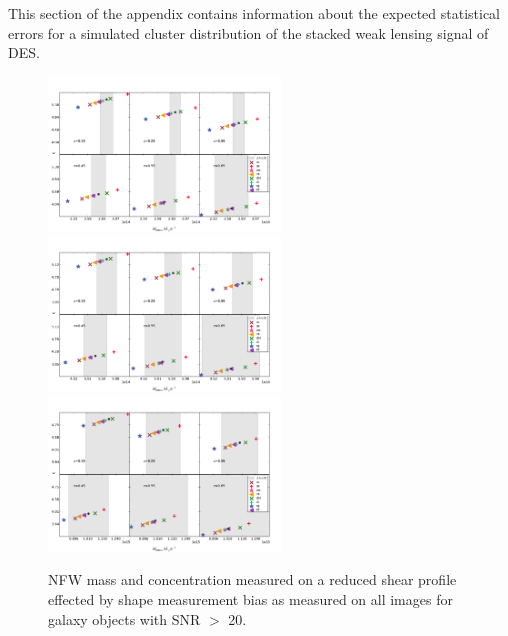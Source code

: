 This section of the appendix contains information about the expected
statistical errors for a simulated cluster distribution of the stacked
weak lensing signal of DES.

\begin{figure}
 \centering  %
  \includegraphics[width=0.55\textwidth]{fig/M_NFW_2.pdf} 
  \includegraphics[width=0.55\textwidth]{fig/M_NFW_3.pdf} 
  \includegraphics[width=0.55\textwidth]{fig/M_NFW_4.pdf} 
  \caption{NFW mass and concentration measured on a reduced shear
    profile effected by shape measurement bias
   as measured on all images for galaxy objects with SNR $>$ 20.}
\label{fig:M_NFW_2}
\end{figure} 


